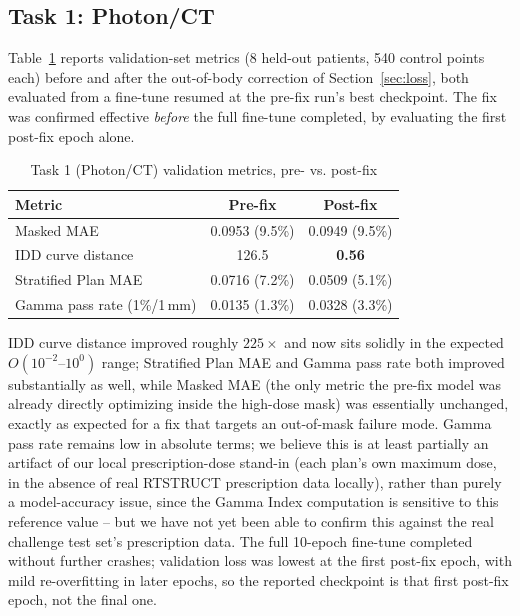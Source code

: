 \documentclass[10pt,conference]{IEEEtran}
\begin{document}
\subsection{Task 1: Photon/CT}

Table~\ref{tab:t1-fix} reports validation-set metrics (8 held-out
patients, 540 control points each) before and after the out-of-body
correction of Section~\ref{sec:loss}, both evaluated from a fine-tune
resumed at the pre-fix run's best checkpoint. The fix was confirmed
effective \emph{before} the full fine-tune completed, by evaluating the
first post-fix epoch alone.

\begin{table}[!t]
\centering
\caption{Task 1 (Photon/CT) validation metrics, pre- vs. post-fix}
\label{tab:t1-fix}
\begin{tabular}{@{}lcc@{}}
\toprule
Metric & Pre-fix & Post-fix \\
\midrule
Masked MAE            & 0.0953 (9.5\%) & 0.0949 (9.5\%) \\
IDD curve distance     & 126.5          & \textbf{0.56} \\
Stratified Plan MAE   & 0.0716 (7.2\%) & 0.0509 (5.1\%) \\
Gamma pass rate (1\%/1\,mm) & 0.0135 (1.3\%) & 0.0328 (3.3\%) \\
\bottomrule
\end{tabular}
\end{table}

IDD curve distance improved roughly $225\times$ and now sits solidly in
the expected $O(10^{-2}\text{--}10^{0})$ range; Stratified Plan MAE and
Gamma pass rate both improved substantially as well, while Masked MAE
(the only metric the pre-fix model was already directly optimizing
inside the high-dose mask) was essentially unchanged, exactly as
expected for a fix that targets an out-of-mask failure mode. Gamma pass
rate remains low in absolute terms; we believe this is at least
partially an artifact of our local prescription-dose stand-in (each
plan's own maximum dose, in the absence of real RTSTRUCT prescription
data locally), rather than purely a model-accuracy issue, since the
Gamma Index computation is sensitive to this reference value -- but we
have not yet been able to confirm this against the real challenge test
set's prescription data. The full 10-epoch fine-tune completed without
further crashes; validation loss was lowest at the first post-fix
epoch, with mild re-overfitting in later epochs, so the reported
checkpoint is that first post-fix epoch, not the final one.
\end{document}
